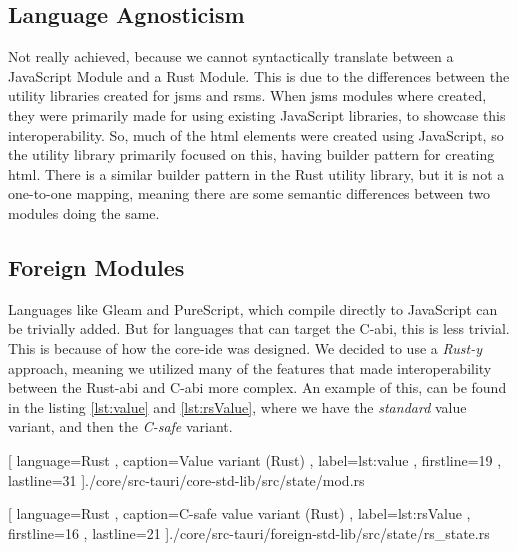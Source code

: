 \subsection{Language Agnosticism}

Not really achieved, because we cannot syntactically translate between a
JavaScript Module and a Rust Module. This is due to the differences between the
utility libraries created for \gls{jsms} and \gls{rsms}. When \gls{jsms} modules
where created, they were primarily made for using existing JavaScript libraries,
to showcase this interoperability. So, much of the \gls{html} elements were
created using JavaScript, so the utility library primarily focused on this,
having builder pattern for creating \gls{html}. There is a similar builder
pattern in the Rust utility library, but it is not a one-to-one mapping, meaning
there are some semantic differences between two modules doing the same.

\subsection{Foreign Modules}

Languages like Gleam and PureScript, which compile directly to JavaScript can
be trivially added. But for languages that can target the C-\gls{abi}, this is
less trivial. This is because of how the core-\gls{ide} was designed. We decided
to use a \textit{Rust-y} approach, meaning we utilized many of the features that
made interoperability between the Rust-\gls{abi} and C-\gls{abi} more complex.
An example of this, can be found in the listing \ref{lst:value} and
\ref{lst:rsValue}, where we have the \textit{standard} value variant, and then
the \textit{C-safe} variant.

\begin{code}[H]
  
    [ language=Rust
    , caption={Value variant (Rust)}
    , label=lst:value
    , firstline=19
    , lastline=31
    ]{./core/src-tauri/core-std-lib/src/state/mod.rs}
\end{code}

\begin{code}[H]
  
    [ language=Rust
    , caption={C-safe value variant (Rust)}
    , label=lst:rsValue
    , firstline=16
    , lastline=21
    ]{./core/src-tauri/foreign-std-lib/src/state/rs\_state.rs}
\end{code}

